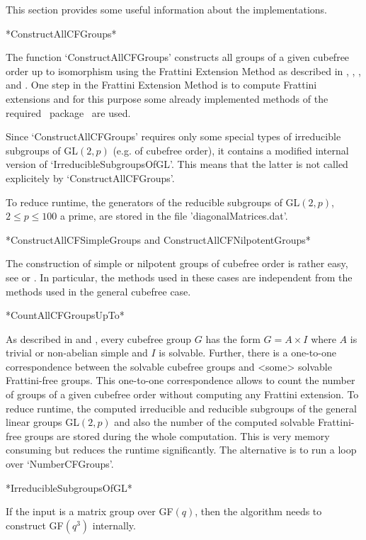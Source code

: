 This section provides some useful information about the implementations.


*ConstructAllCFGroups*

The function `ConstructAllCFGroups' constructs all groups of a given
cubefree order up to isomorphism using the Frattini Extension Method as described in \cite{Di05},
  \cite{DiEi05}, \cite{BeEia}, and \cite{BeEib}. One step in the Frattini
  Extension Method is to compute Frattini extensions 
  and for this purpose some already implemented
methods of the required \GAP ~package \GrpConst ~are used. 

Since `ConstructAllCFGroups' requires only
some special types of irreducible subgroups of GL$(2,p)$ (e.g. of cubefree order), it
contains a modified internal version of
`IrreducibleSubgroupsOfGL'. This means that the latter is not called explicitely by
`ConstructAllCFGroups'.

To reduce runtime, the generators of the reducible subgroups of GL$(2,p)$,
$2\leq p \leq 100$ a prime, are stored in the file 'diagonalMatrices.dat'.



*ConstructAllCFSimpleGroups and ConstructAllCFNilpotentGroups*

The construction of simple or nilpotent groups of cubefree
order is rather easy, see \cite{Di05} or \cite{DiEi05}. In particular, the
methods used in these cases are independent from the methods used in the general cubefree case.



*CountAllCFGroupsUpTo*

As described in \cite{Di05} and \cite{DiEi05}, every cubefree group $G$ has
the form $G=A\times I$ where $A$ is trivial or non-abelian simple and $I$ is
solvable. Further, there is a one-to-one correspondence between the solvable
cubefree groups and <some> solvable Frattini-free groups. This one-to-one
correspondence allows to count the number of groups of a given cubefree order without
computing any Frattini extension.
To reduce runtime, the
computed irreducible and reducible subgroups of the general linear groups
GL$(2,p)$ and also the number of the computed solvable
Frattini-free groups are stored during the whole computation. This is very
memory consuming but reduces the runtime significantly. The alternative is to run a loop over `NumberCFGroups'.

*IrreducibleSubgroupsOfGL*

If the input is a matrix group over GF$(q)$, then the algorithm needs to construct GF$(q^3)$ internally. 



